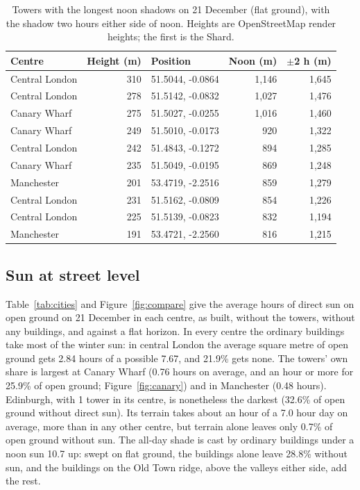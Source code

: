 \documentclass[11pt,a4paper]{article}
\begin{document}
\begin{table}[tbp]\centering\small\caption{Towers with the longest noon shadows on 21 December (flat ground), with the shadow two hours either side of noon. Heights are OpenStreetMap render heights; the first is the Shard.}\label{tab:towers}\begin{tabular}{lrlrr}\toprule Centre & Height (m) & Position & Noon (m) & $\pm$2 h (m)\\\midrule
Central London & 310 & 51.5044, -0.0864 & 1,146 & 1,645\\
Central London & 278 & 51.5142, -0.0832 & 1,027 & 1,476\\
Canary Wharf & 275 & 51.5027, -0.0255 & 1,016 & 1,460\\
Canary Wharf & 249 & 51.5010, -0.0173 & 920 & 1,322\\
Central London & 242 & 51.4843, -0.1272 & 894 & 1,285\\
Canary Wharf & 235 & 51.5049, -0.0195 & 869 & 1,248\\
Manchester & 201 & 53.4719, -2.2516 & 859 & 1,279\\
Central London & 231 & 51.5162, -0.0809 & 854 & 1,226\\
Central London & 225 & 51.5139, -0.0823 & 832 & 1,194\\
Manchester & 191 & 53.4721, -2.2560 & 816 & 1,215\\
\bottomrule\end{tabular}\end{table}

\subsection{Sun at street level}
Table~\ref{tab:cities} and Figure~\ref{fig:compare} give the average hours of direct sun on open ground on 21 December in each centre, as built, without the towers, without any buildings, and against a flat horizon. In every centre the ordinary buildings take most of the winter sun: in central London the average square metre of open ground gets 2.84 hours of a possible 7.67, and 21.9\% gets none. The towers' own share is largest at Canary Wharf (0.76 hours on average, and an hour or more for 25.9\% of open ground; Figure~\ref{fig:canary}) and in Manchester (0.48 hours). Edinburgh, with 1 tower in its centre, is nonetheless the darkest (32.6\% of open ground without direct sun). Its terrain takes about an hour of a 7.0 hour day on average, more than in any other centre, but terrain alone leaves only 0.7\% of open ground without sun. The all-day shade is cast by ordinary buildings under a noon sun 10.7\textdegree{} up: swept on flat ground, the buildings alone leave 28.8\% without sun, and the buildings on the Old Town ridge, above the valleys either side, add the rest.
\end{document}
